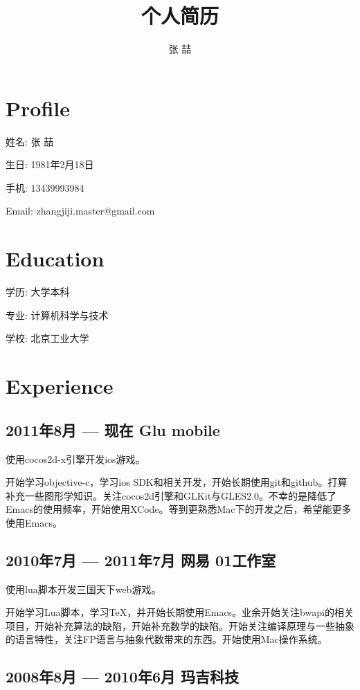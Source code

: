 \documentclass[11pt,a4paper]{article}
\begin{document}
\title{个人简历}
\author{张 喆}

\maketitle

\newpage

\section*{Profile}

姓名: 张 喆

生日: 1981年2月18日

手机: 13439993984

Email: zhangjiji.master@gmail.com

\section*{Education}

学历: 大学本科

专业: 计算机科学与技术

学校: 北京工业大学

\section*{Experience}

\subsection*{2011年8月 --- 现在 \quad Glu mobile}

使用cocos2d-x引擎开发ios游戏。

开始学习objective-c，学习ios SDK和相关开发，开始长期使用git和github。打算补充一些图形学知识。关注cocos2d引擎和GLKit与GLES2.0。不幸的是降低了Emacs的使用频率，开始使用XCode。等到更熟悉Mac下的开发之后，希望能更多使用Emacs。

\subsection*{2010年7月 --- 2011年7月 \quad 网易 01工作室}

使用lua脚本开发三国天下web游戏。

开始学习Lua脚本，学习\TeX，并开始长期使用Emacs。业余开始关注bwapi的相关项目，开始补充算法的缺陷，开始补充数学的缺陷。开始关注编译原理与一些抽象的语言特性，关注FP语言与抽象代数带来的东西。开始使用Mac操作系统。

\subsection*{2008年8月 --- 2010年6月 \quad 玛吉科技}
\end{document}

